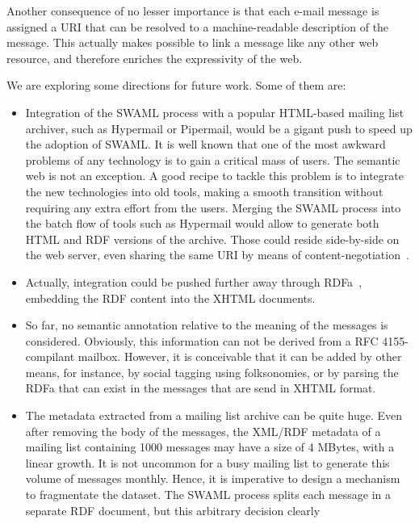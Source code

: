\documentclass{llncs}
\begin{document}
Another consequence of no lesser importance is that each e-mail message
is assigned a URI that can be resolved to a machine-readable description
of the message. This actually makes possible to link a message like
any other web resource, and therefore enriches the expressivity of the
web.

We are exploring some directions for future work. Some of them are:

\begin{itemize}
  \item Integration of the SWAML process with a popular HTML-based
        mailing list archiver, such as Hypermail or Pipermail, would be
        a gigant push to speed up the adoption of SWAML. It is well
        known that one of the most awkward problems of any technology
        is to gain a critical mass of users. The semantic web is not
        an exception. A good recipe to tackle this problem is to
        integrate the new technologies into old tools, making
        a smooth transition without requiring any extra effort from
        the users. Merging the SWAML process into the batch flow of
        tools such as Hypermail would allow to generate both
        HTML and RDF versions of the archive. Those could reside
        side-by-side on the web server, even sharing the same URI
        by means of content-negotiation~\cite{Recipes}.
  \item Actually, integration could be pushed further away through
        RDFa~\cite{Birbeck2006}, embedding the RDF content into the
        XHTML documents.
  \item So far, no semantic annotation relative to the meaning of
        the messages is considered. Obviously, this information can not
        be derived from a RFC 4155-compilant mailbox.
        However, it is
        conceivable that it can be added by other means, for instance,
        by social tagging using folksonomies, or by parsing the RDFa
        that can exist in the messages that are send in XHTML format.
  \item The metadata extracted from a mailing list archive can be
        quite huge. Even after removing the body of the messages, the
        XML/RDF metadata of a mailing list containing 1000 messages may
        have a size of 4 MBytes, with a linear growth. It is not uncommon
        for a busy mailing list to generate this volume of messages
        monthly. Hence, it is imperative to design a mechanism to
        fragmentate the dataset. The SWAML process splits each message
        in a separate RDF document, but this arbitrary decision clearly

\end{itemize}
\end{document}

